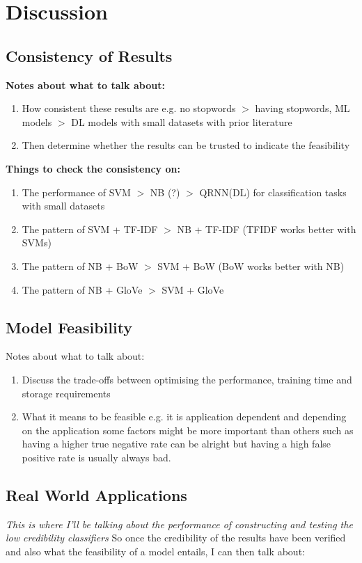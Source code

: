 \documentclass[a4paper,twoside,phd]{BYUPhys}
\begin{document}
\chapter{Discussion}
\label{chap:Discussion}

\section{Consistency of Results}
\label{sec:ConsistencyOfResults}
\textbf{Notes about what to talk about:}
\begin{enumerate}[-]
	\item How consistent these results are e.g. no stopwords $>$ having stopwords, ML models $>$ DL models with small datasets with prior literature
	\item Then determine whether the results can be trusted to indicate the feasibility
\end{enumerate}

\textbf{Things to check the consistency on:}
\begin{enumerate}[-]
	\item The performance of SVM $>$ NB (?) $>$ QRNN(DL) for classification tasks with small datasets
	\item The pattern of SVM + TF-IDF $>$ NB + TF-IDF (TFIDF works better with SVMs)
	\item The pattern of NB + BoW $>$ SVM + BoW (BoW works better with NB)
	\item The pattern of NB + GloVe $>$ SVM + GloVe
\end{enumerate}

\section{Model Feasibility}
\label{sec:ModelFeasibility}
Notes about what to talk about:
\begin{enumerate}[-]
	\item Discuss the trade-offs between optimising the performance, training time and storage requirements
	\item What it means to be feasible e.g. it is application dependent and depending on the application some factors might be more important than others such as having a higher true negative rate can be alright but having a high false positive rate is usually always bad.
\end{enumerate}

\section{Real World Applications}
\label{sec:RealWorldApplication}
\textit{This is where I'll be talking about the performance of constructing and testing the low credibility classifiers}
So once the credibility of the results have been verified and also what the feasibility of a model entails, I can then talk about:
\end{document}
